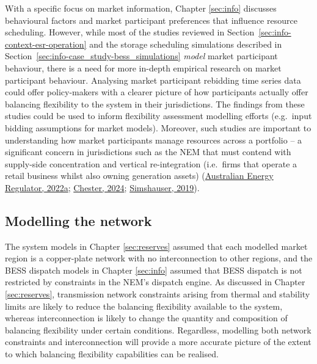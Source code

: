 \documentclass[12pt,a4paper,]{report}
\begin{document}
With a specific focus on market information, Chapter \ref{sec:info}
discusses behavioural factors and market participant preferences that
influence resource scheduling. However, while most of the studies
reviewed in Section~\ref{sec:info-context-esr-operation} and the storage
scheduling simulations described in
Section~\ref{sec:info-case_study-bess_simulations} \emph{model} market
participant behaviour, there is a need for more in-depth empirical
research on market participant behaviour. Analysing market participant
rebidding time series data could offer policy-makers with a clearer
picture of how participants actually offer balancing flexibility to the
system in their jurisdictions. The findings from these studies could be
used to inform flexibility assessment modelling efforts (e.g.~input
bidding assumptions for market models). Moreover, such studies are
important to understanding how market participants manage resources
across a portfolio -- a significant concern in jurisdictions such as the
NEM that must contend with supply-side concentration and vertical
re-integration (i.e.~firms that operate a retail business whilst also
owning generation assets)
(\protect\hyperlink{ref-australianenergyregulatorStateEnergyMarket2022}{Australian
Energy Regulator, 2022a};
\protect\hyperlink{ref-chesterAustraliaNationalElectricity2024}{Chester,
2024};
\protect\hyperlink{ref-simshauserLessonsAustraliaNational2019}{Simshauser,
2019}).

\hypertarget{modelling-the-network}{%
\subsection{Modelling the network}\label{modelling-the-network}}

The system models in Chapter \ref{sec:reserves} assumed that each
modelled market region is a copper-plate network with no interconnection
to other regions, and the BESS dispatch models in Chapter \ref{sec:info}
assumed that BESS dispatch is not restricted by constraints in the NEM's
dispatch engine. As discussed in Chapter \ref{sec:reserves},
transmission network constraints arising from thermal and stability
limits are likely to reduce the balancing flexibility available to the
system, whereas interconnection is likely to change the quantity and
composition of balancing flexibility under certain conditions.
Regardless, modelling both network constraints and interconnection will
provide a more accurate picture of the extent to which balancing
flexibility capabilities can be realised.
\end{document}
